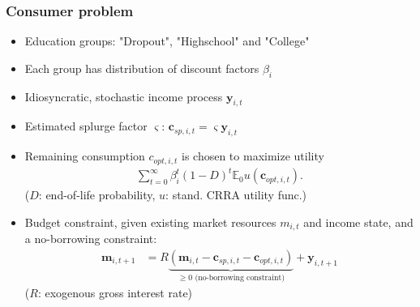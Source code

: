 \documentclass[pdflatex,aspectratio=169]{beamer}
\begin{document}
    \begin{frame}
      \frametitle{Consumer problem}


      \begin{itemize}[<+->]
      \item Education groups: "Dropout", "Highschool" and "College"
      \item Each group has distribution of discount factors $\beta_i$
      \item Idiosyncratic, stochastic income process $\mathbf{y}_{i,t}$
      \item Estimated splurge factor $\varsigma$: $\mathbf{c}_{sp,i,t} = \varsigma \mathbf{y}_{i,t}$
        \pause
      \item Remaining consumption $c_{opt,i,t}$ is chosen to maximize utility
        \begin{align}
          \sum_{t=0}^{\infty}\beta_i^t (1-D)^t \mathbb{E}_0 u(\mathbf{c}_{opt,i,t}).
        \end{align}
        ($D$: end-of-life probability, $u$: stand. CRRA utility func.)	
      \item Budget constraint, given existing market resources $m_{i,t}$ and income state, and a no-borrowing constraint: 
        \begin{align}
          \mathbf{m}_{i,t+1} &= R \underbrace{(\mathbf{m}_{i,t} - \mathbf{c}_{sp,i,t} - \mathbf{c}_{opt,i,t})}_{\geq 0 \text{ (no-borrowing constraint)}} + \mathbf{y}_{i,t+1}
        \end{align}
        ($R$: exogenous gross interest rate)
      \end{itemize}



    \end{frame}
\end{document}
